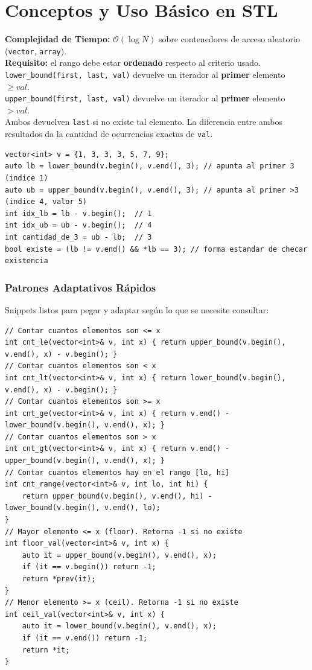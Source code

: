 \documentclass[10pt,twocolumn,letterpaper]{report}
\begin{document}
\section{Conceptos y Uso Básico en STL}
\textbf{Complejidad de Tiempo:} $\mathcal{O}(\log N)$ sobre contenedores de acceso aleatorio (\texttt{vector}, \texttt{array}). \\
\textbf{Requisito:} el rango debe estar \textbf{ordenado} respecto al criterio usado. \\
\texttt{lower\_bound(first, last, val)} devuelve un iterador al \textbf{primer} elemento $\geq val$. \\
\texttt{upper\_bound(first, last, val)} devuelve un iterador al \textbf{primer} elemento $> val$. \\
Ambos devuelven \texttt{last} si no existe tal elemento. La diferencia entre ambos resultados da la cantidad de ocurrencias exactas de \texttt{val}.
\begin{lstlisting}
vector<int> v = {1, 3, 3, 3, 5, 7, 9};
auto lb = lower_bound(v.begin(), v.end(), 3); // apunta al primer 3 (indice 1)
auto ub = upper_bound(v.begin(), v.end(), 3); // apunta al primer >3 (indice 4, valor 5)
int idx_lb = lb - v.begin();  // 1
int idx_ub = ub - v.begin();  // 4
int cantidad_de_3 = ub - lb;  // 3
bool existe = (lb != v.end() && *lb == 3); // forma estandar de checar existencia
\end{lstlisting}
\subsubsection{Patrones Adaptativos Rápidos}
Snippets listos para pegar y adaptar según lo que se necesite consultar:
\begin{lstlisting}
// Contar cuantos elementos son <= x
int cnt_le(vector<int>& v, int x) { return upper_bound(v.begin(), v.end(), x) - v.begin(); }
// Contar cuantos elementos son < x
int cnt_lt(vector<int>& v, int x) { return lower_bound(v.begin(), v.end(), x) - v.begin(); }
// Contar cuantos elementos son >= x
int cnt_ge(vector<int>& v, int x) { return v.end() - lower_bound(v.begin(), v.end(), x); }
// Contar cuantos elementos son > x
int cnt_gt(vector<int>& v, int x) { return v.end() - upper_bound(v.begin(), v.end(), x); }
// Contar cuantos elementos hay en el rango [lo, hi]
int cnt_range(vector<int>& v, int lo, int hi) {
    return upper_bound(v.begin(), v.end(), hi) - lower_bound(v.begin(), v.end(), lo);
}
// Mayor elemento <= x (floor). Retorna -1 si no existe
int floor_val(vector<int>& v, int x) {
    auto it = upper_bound(v.begin(), v.end(), x);
    if (it == v.begin()) return -1;
    return *prev(it);
}
// Menor elemento >= x (ceil). Retorna -1 si no existe
int ceil_val(vector<int>& v, int x) {
    auto it = lower_bound(v.begin(), v.end(), x);
    if (it == v.end()) return -1;
    return *it;
}
\end{lstlisting}
\end{document}
